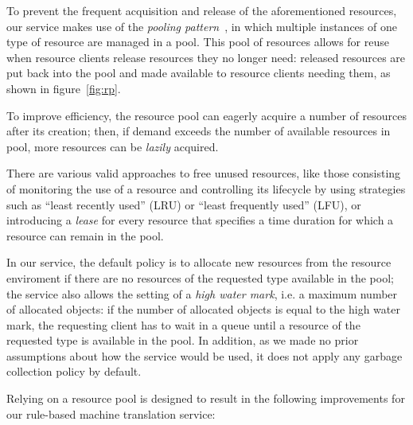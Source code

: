 \documentclass[11pt]{article}
\begin{document}
To prevent the frequent acquisition and release of the aforementioned resources, our service makes use of the \emph{pooling pattern}~\citep{kircher2001}, in which multiple instances of one type of resource are managed in a pool. This pool of resources allows for reuse when resource clients release resources they no longer need: released resources are put back into the pool and made available to resource clients needing them, as shown in figure~\ref{fig:rp}.

To improve efficiency, the resource pool can eagerly acquire a number of resources after its creation; then, if demand exceeds the number of available resources in pool, more resources can be \emph{lazily} acquired.

There are various valid approaches to free unused resources, like those consisting of monitoring the use of a resource and controlling its lifecycle by using  strategies such as ``least recently used'' (LRU) or ``least frequently used'' (LFU), or introducing a \emph{lease} for every resource that specifies a time duration for which a resource can remain in the pool.

In our service, the default policy is to allocate new resources from the resource enviroment if there are no resources of the requested type available in the pool; the service also allows the setting of a \emph{high water mark}, i.e. a maximum number of allocated objects: if the number of allocated objects is equal to the high water mark, the requesting client has to wait in a queue until a resource of the requested type is available in the pool. In addition, as we made no prior assumptions about how the service would be used, it does not apply any garbage collection policy by default.

Relying on a resource pool is designed to result in the following improvements for our rule-based machine translation service:
\end{document}
